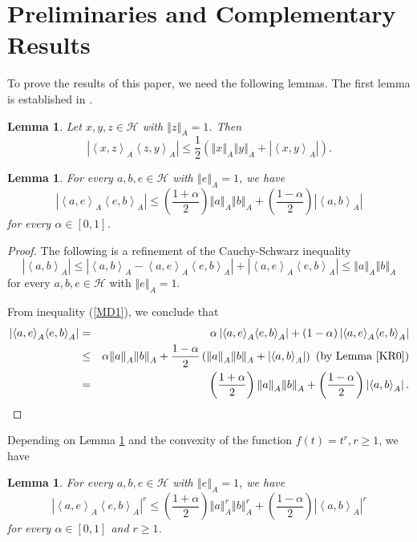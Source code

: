 \documentclass{article}
\newcommand{\bra}[1]{\left(#1\right)}
\newcommand{\seqA}[1]{{\left<#1\right>}_{A}}
\newcommand{\normA}[1]{{\left\Vert#1\right\Vert}_{A}}
\newcommand{\abs}[1]{\left\vert#1\right\vert}
\newcommand {\h}{\mathcal{H}}
\newtheorem{lemma}[theorem]{Lemma}
\begin{document}
\section{Preliminaries and Complementary Results}
To prove the results of this paper, we need the following lemmas. The first lemma
is established in \cite{XYZ}.
\begin{lemma}\label{KR0} Let $x,y,z\in\h$ with $\normA{z}=1$. Then
\begin{equation*}
  \abs{\seqA{x,z}\seqA{z,y}}\leq \frac{1}{2}\bra{\normA{x}\normA{y}+\abs{\seqA{x,y}}}.
\end{equation*}
\end{lemma}
\begin{lemma}\label{Lemma3.18} For every $a,b,e\in\h$ with $\normA{e}=1$, we have
\begin{equation}\label{MD1}
  \abs{\seqA{a,e}\seqA{e,b}}\leq \bra{\frac{1+\alpha}{2}}\normA{a}\normA{b}+\bra{\frac{1-\alpha}{2}}\abs{\seqA{a,b}}
\end{equation}
for every $\alpha\in [0,1]$.
\end{lemma}
\begin{proof} The following is a refinement of the Cauchy-Schwarz inequality
$$\abs{\seqA{a,b}}\leq \abs{\seqA{a,b}-\seqA{a,e}\seqA{e,b}}+\abs{\seqA{a,e}\seqA{e,b}}\leq \normA{a}\normA{b}$$
for every $a,b,e\in\h$ with $\normA{e}=1$.

From inequality (\ref{MD1}), we conclude that
\begin{eqnarray*}
  \abs{\seqA{a,e}\seqA{e,b}} &=& \alpha\abs{\seqA{a,e}\seqA{e,b}}+(1-\alpha)\abs{\seqA{a,e}\seqA{e,b}} \\
   &\leq& \alpha\normA{a}\normA{b}+\frac{1-\alpha}{2}\bra{\normA{a}\normA{b}+\abs{\seqA{a,b}}} \,\,\bra{\mbox{by Lemma \ref{KR0}}} \\
   &=&\bra{\frac{1+\alpha}{2}}\normA{a}\normA{b}+\bra{\frac{1-\alpha}{2}}\abs{\seqA{a,b}}.
\end{eqnarray*}
\end{proof}
Depending on Lemma \ref{Lemma3.18} and the   convexity of the function
$f(t)=t^r,r\geq 1$, we have
\begin{lemma} \label{Lemma3.19}For every $a,b,e\in\h$ with $\normA{e}=1$, we have
\begin{equation}\label{MD2}
  \abs{\seqA{a,e}\seqA{e,b}}^{r}\leq \bra{\frac{1+\alpha}{2}}\normA{a}^{r}\normA{b}^{r}+\bra{\frac{1-\alpha}{2}}\abs{\seqA{a,b}}^{r}
\end{equation}
for every $\alpha\in [0,1]$ and $r\geq 1$.
\end{lemma}
\end{document}
